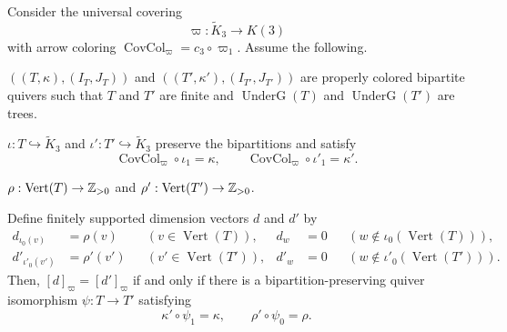 \begin{lemma}\label{lem:cover-dimension-equivalence}
Consider the universal covering
\[
 \varpi:\widetilde K_3\longrightarrow K(3)
\]
with arrow coloring $\operatorname{CovCol}_{\varpi}=c_3\circ\varpi_1$.
Assume the following.
\begin{hypotheses}
\item\label{hyp:dimensioned-trees} $((T,\kappa),(I_T,J_T))$ and $((T',\kappa'),(I_{T'},J_{T'}))$ are properly colored bipartite quivers such that $T$ and $T'$ are finite and $\operatorname{UnderG}(T)$ and $\operatorname{UnderG}(T')$ are trees.
\item\label{hyp:dimensioned-embeddings} $\iota:T\hookrightarrow\widetilde K_3$ and $\iota':T'\hookrightarrow\widetilde K_3$ preserve the bipartitions and satisfy
\[
 \operatorname{CovCol}_{\varpi}\circ\iota_1=\kappa,\qquad
 \operatorname{CovCol}_{\varpi}\circ\iota'_1=\kappa'.
\]
\item\label{hyp:positive-tree-dimensions} $\rho:\operatorname{Vert}(T)\to\mathbb Z_{>0}$ and $\rho':\operatorname{Vert}(T')\to\mathbb Z_{>0}$.
\end{hypotheses}
Define finitely supported dimension vectors $d$ and $d'$ by
\[
\begin{aligned}
 d_{\iota_0(v)}&=\rho(v)&& (v\in\operatorname{Vert}(T)),&
 d_w&=0&& (w\notin\iota_0(\operatorname{Vert}(T))),\\
 d'_{\iota'_0(v')}&=\rho'(v')&& (v'\in\operatorname{Vert}(T')),&
 d'_w&=0&& (w\notin\iota'_0(\operatorname{Vert}(T'))).
\end{aligned}
\]
Then, $[d]_{\varpi}=[d']_{\varpi}$ if and only if there is a bipartition-preserving quiver isomorphism $\psi:T\to T'$ satisfying
\[
 \kappa'\circ\psi_1=\kappa,\qquad
 \rho'\circ\psi_0=\rho.
\]
\end{lemma}
